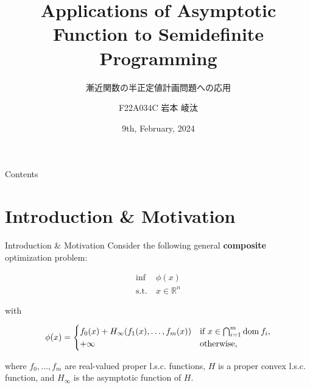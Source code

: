 \documentclass[aspectratio=169, dvipdfmx, 11pt]{beamer}
\title[Asymptotic Function の半正定値計画問題への応用]{Applications of Asymptotic Function to Semidefinite Programming}
\subtitle{漸近関数の半正定値計画問題への応用}
\author[Ryota Iwamoto]{F22A034C 岩本 崚汰}
\institute[Niigata Univ]{Niigata Univ}
\date{9th, February, 2024}
\newcommand{\NDemenstionalRealEuclideanSpace}{\mathbb{R}^n}
\newcommand{\Domain}[1]{\text{\rm dom\:${#1}$}} %
\begin{document}
\maketitle

\begin{frame}{Contents}
  \tableofcontents
\end{frame}

\section{Introduction \& Motivation}


\begin{frame}{Introduction \& Motivation}
  Consider the following general \textbf{composite} optimization problem:

  \begin{equation}
    \begin{aligned}
      \inf \:& \phi(x) \\
      \text{s.t.} \:& x \in \NDemenstionalRealEuclideanSpace
    \end{aligned} \tag{CM} \label{eq:cm}
  \end{equation}

  with

  \begin{equation}
    \phi(x)=
    \begin{cases}
      f_0 (x) + H_{\infty} (f_1(x), \ldots, f_m(x)) & \text{if $x \in \bigcap_{i =1}^{m} \Domain{f_i}$,} \\
      +\infty      & \text{otherwise,} \notag
    \end{cases}
  \end{equation}

  where $f_0, \ldots, f_m$ are real-valued proper l.s.c. functions, $H$ is a proper convex l.s.c. function, and $H_{\infty}$ is the asymptotic function of $H$.
\end{frame}
\end{document}
